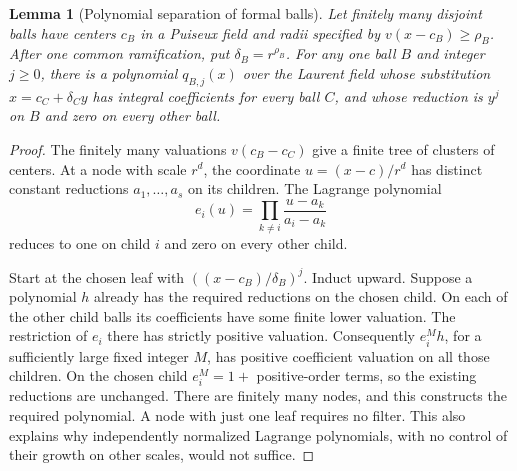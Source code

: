 \documentclass[11pt]{article}
\newtheorem{lemma}[theorem]{Lemma}
\theoremstyle{definition}\newtheorem{definition}[theorem]{Definition}
\theoremstyle{remark}\newtheorem{remark}[theorem]{Remark}
\begin{document}
\begin{lemma}[Polynomial separation of formal balls]\label{lem:ballseparation}
Let finitely many disjoint balls have centers $c_B$ in a Puiseux field
and radii specified by $v(x-c_B)\geq\rho_B$. After one common
ramification, put $\delta_B=r^{\rho_B}$. For any one ball $B$ and
integer $j\geq0$, there is a polynomial $q_{B,j}(x)$ over the Laurent
field whose substitution $x=c_C+\delta_C y$ has integral coefficients
for every ball $C$, and whose reduction is $y^j$ on $B$ and zero on
every other ball.
\end{lemma}
\begin{proof}
The finitely many valuations $v(c_B-c_C)$ give a finite tree of
clusters of centers. At a node with scale $r^d$, the coordinate
$u=(x-c)/r^d$ has distinct constant reductions $a_1,\ldots,a_s$
on its children. The Lagrange polynomial
\[
 e_i(u)=\prod_{k\ne i}\frac{u-a_k}{a_i-a_k}
\]
reduces to one on child $i$ and zero on every other child.

Start at the chosen leaf with $((x-c_B)/\delta_B)^j$. Induct upward.
Suppose a polynomial $h$ already has the required reductions on the
chosen child. On each of the other child balls its coefficients have
some finite lower valuation. The restriction of $e_i$ there has
strictly positive valuation. Consequently $e_i^M h$, for a sufficiently
large fixed integer $M$, has positive coefficient valuation on all
those children. On the chosen child $e_i^M=1+$ positive-order terms,
so the existing reductions are unchanged. There are finitely many
nodes, and this constructs the required polynomial. A node with just
one leaf requires no filter. This also explains why independently
normalized Lagrange polynomials, with no control of their growth on
other scales, would not suffice.
\end{proof}
\end{document}
